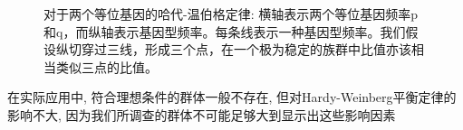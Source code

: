 \documentclass[AutoFakeBold]{LZUThesis}
\begin{document}
\begin{figure}[H]
    \centering
    \caption{对于两个等位基因的哈代-温伯格定律: 横轴表示两个等位基因频率p和q，而纵轴表示基因型频率。每条线表示一种基因型频率。我们假设纵切穿过三线，形成三个点，在一个极为稳定的族群中比值亦该相当类似三点的比值。}
    \label{fig_ldr}
\end{figure}


在实际应用中, 符合理想条件的群体一般不存在, 但对Hardy-Weinberg平衡定律的影响不大, 因为我们所调查的群体不可能足够大到显示出这些影响因素
\end{document}

